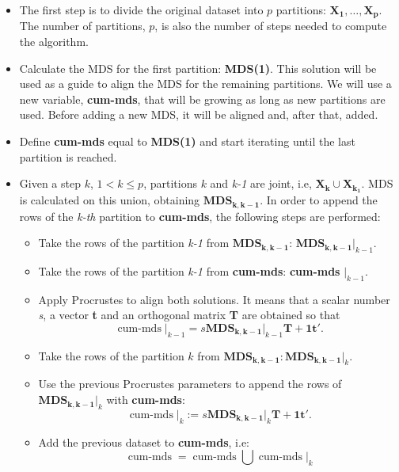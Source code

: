 \documentclass[11pt]{report}
\DeclareMathOperator{\cummds}{cum-mds}
\begin{document}
\begin{itemize}

\item The first step is to divide the original dataset into $p$ partitions: 
$\mathbf{X_1},\dots, \mathbf{X_p}$. The number of partitions, $p$, is also
the number of steps needed to compute the algorithm.

\item Calculate the MDS for the first partition: \textbf{MDS(1)}. This solution
will be used as a guide to align the MDS for the remaining partitions. We will 
use a new variable, \textbf{cum-mds}, that will be growing as long as new 
partitions are used. Before adding a new MDS, it will be aligned and, after 
that, added. 

\item Define \textbf{cum-mds} equal to \textbf{MDS(1)} and start iterating 
until the last partition is reached.

\item Given a step $k$, $1 < k \leq p$, partitions $k$ and \textit{k-1} are 
joint, i.e, $\mathbf{X_k} \cup \mathbf{X_{k_1}}$. MDS is calculated on 
this union, obtaining $\mathbf{MDS_{k, k-1}}$. In order to append the
rows of the \textit{k-th} partition to \textbf{cum-mds}, the following steps 
are performed:

\begin{itemize}
\item Take the rows of the partition \textit{k-1} from $\mathbf{MDS_{k, k-1}}$: 
$\mathbf{MDS_{k, k-1}} \Bigr|_{k-1}$.
\item Take the rows of the partition \textit{k-1} from \textbf{cum-mds}: 
\textbf{cum-mds} $\Bigr|_{k-1}$.
\item Apply Procrustes to align both solutions. It means that a scalar number
\textit{s}, a vector \textbf{t} and an orthogonal matrix \textbf{T} are obtained
so that
\[
\boldsymbol{\cummds} \Bigr|_{k-1} = s \mathbf{MDS_{k, k-1}} \Bigr|_{k-1} \mathbf{T} + \mathbf{1t}'.
\]
\item Take the rows of the partition $k$ from $\mathbf{MDS_{k, k-1}}: \mathbf{MDS_{k, k-1}} \Bigr|_{k}$.
\item Use the previous Procrustes parameters to append the rows of 
$\mathbf{MDS_{k, k-1}} \Bigr|_{k}$ with \textbf{cum-mds}:
\[
\boldsymbol{\cummds} \Bigr|_{k} := s \mathbf{\mathbf{MDS_{k, k-1}}} \Bigr|_{k} \mathbf{T} + \mathbf{1t}'.
\]
\item Add the previous dataset to \textbf{cum-mds}, i.e:
\[
\boldsymbol{\cummds} = \boldsymbol{\cummds} \bigcup \boldsymbol{{\cummds}} \Bigr|_{k}
\]

\end{itemize}
\end{itemize}
\end{document}
